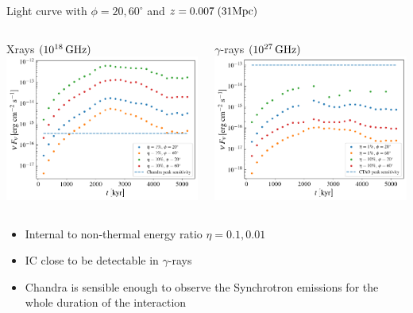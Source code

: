 \begin{frame}{Light curve with $\phi=20,60^{\circ}$ and $z=0.007\;(31{\rm Mpc})$}
	\begin{columns}
		\begin{column}{.5\textwidth}
		\centering
		{\scriptsize Xrays $(10^{18}\,{\rm GHz})$}
			\includegraphics[width=.95\textwidth]{images/Chandra_Sync.png}
		\end{column}
		\begin{column}{.5\textwidth}
				\centering
          {\scriptsize $\gamma$-rays $(10^{27}\,{\rm GHz})$}
   	\includegraphics[width=.95\textwidth]{images/CTAO_IC.png}
		\end{column}
	\end{columns}
		{\scriptsize
			\begin{itemize}
				\item Internal to non-thermal energy ratio $\eta=0.1,0.01$
				\item IC close to be detectable in $\gamma$-rays
				\item Chandra is sensible enough to observe the Synchrotron emissions for the whole duration of the interaction
			\end{itemize}
		}
\end{frame}

